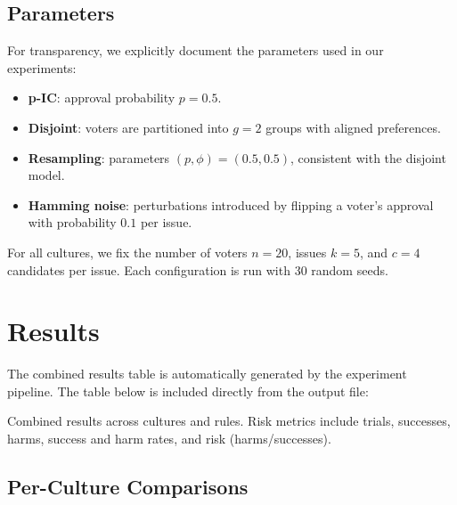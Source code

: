 \documentclass[11pt]{article}
\begin{document}
\subsection{Parameters}
For transparency, we explicitly document the parameters used in our experiments:

\begin{itemize}
    \item \textbf{p-IC}: approval probability $p=0.5$.
    \item \textbf{Disjoint}: voters are partitioned into $g = 2$ groups with
    aligned preferences.
    \item \textbf{Resampling}: parameters $(p,\phi) = (0.5,0.5)$, consistent
    with the disjoint model.
    \item \textbf{Hamming noise}: perturbations introduced by flipping a
    voter’s approval with probability $0.1$ per issue.
\end{itemize}

For all cultures, we fix the number of voters $n=20$, issues $k=5$, and
$c=4$ candidates per issue. Each configuration is run with 30 random seeds.

\section{Results}
The combined results table is automatically generated by the experiment
pipeline. The table below is included directly from the output file:

\begin{table}[h!]
\centering
\resizebox{\textwidth}{!}{%

}
\caption{Combined results across cultures and rules. Risk metrics include trials,
successes, harms, success and harm rates, and risk (harms/successes).}
\label{tab:combined}
\end{table}

\subsection{Per-Culture Comparisons}
\end{document}
